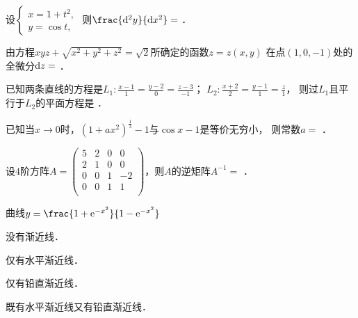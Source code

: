 \documentclass[plain,noanswer,medmath]{../../template/jnuexam}
\begin{document}




\begin{problem}
设$\begin{cases}
  x = 1 + t^2, \\
  y = \cos t,
\end{cases}$ 则$\frac{\d^2y}{\dx^2} =$ \fillin{}．
\end{problem}


\begin{problem}
由方程$xyz + \sqrt{x^2 + y^2 + z^2} = \sqrt{2}$所确定的函数$z = z(x,y)$
在点$(1,0, - 1)$处的全微分$\mathop{}\!\mathrm{d} z =$ \fillin{}．
\end{problem}


\begin{problem}
已知两条直线的方程是$L_1:\frac{x - 1}{1} = \frac{y - 2}{0} = \frac{z - 3}{-1}$；
$L_2:\frac{x + 2}{2} = \frac{y - 1}{1} = \frac{z}{1}$，
则过$L_1$且平行于$L_2$的平面方程是 \fillin{}．
\end{problem}


\begin{problem}
已知当$x \to 0$时，$(1 + ax^2)^{\frac{1}{3}} - 1$与$\cos x - 1$是等价无穷小，
则常数$a =$ \fillin{}．
\end{problem}


\begin{problem}
设$4$阶方阵$A=\begin{pmatrix}
 5 & 2 & 0 &  0 \\
 2 & 1 & 0 &  0 \\
 0 & 0 & 1 & -2 \\
 0 & 0 & 1 &  1 \\
\end{pmatrix}$，则$A$的逆矩阵$A^{-1}=$ \fillin{}．
\end{problem}




\begin{problem}
曲线$y = \frac{1 + \e^{- x^2}}{1 - \e^{- x^2}}$	\pickout{}
\begin{abcd*}
\item 没有渐近线．					
\item 仅有水平渐近线．
\item 仅有铅直渐近线．				
\item 既有水平渐近线又有铅直渐近线．
\end{abcd*}
\end{problem}
\end{document}

